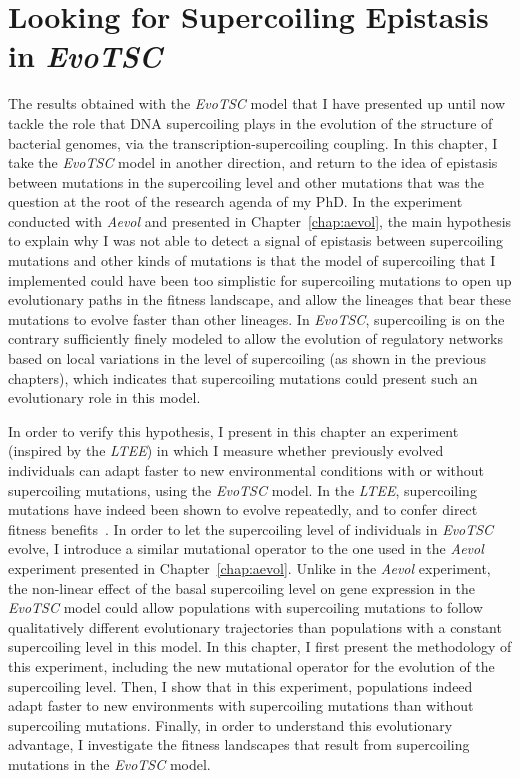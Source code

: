 \chapter{Looking for Supercoiling Epistasis in \emph{EvoTSC}}
\label{chap:epistasis}

The results obtained with the \emph{EvoTSC} model that I have presented up until now tackle the role that DNA supercoiling plays in the evolution of the structure of bacterial genomes, via the transcription-supercoiling coupling.
In this chapter, I take the \emph{EvoTSC} model in another direction, and return to the idea of epistasis between mutations in the supercoiling level and other mutations that was the question at the root of the research agenda of my PhD.
In the experiment conducted with \emph{Aevol} and presented in Chapter~\ref{chap:aevol}, the main hypothesis to explain why I was not able to detect a signal of epistasis between supercoiling mutations and other kinds of mutations is that the model of supercoiling that I implemented could have been too simplistic for supercoiling mutations to open up evolutionary paths in the fitness landscape, and allow the lineages that bear these mutations to evolve faster than other lineages.
In \emph{EvoTSC}, supercoiling is on the contrary sufficiently finely modeled to allow the evolution of regulatory networks based on local variations in the level of supercoiling (as shown in the previous chapters), which indicates that supercoiling mutations could present such an evolutionary role in this model.

In order to verify this hypothesis, I present in this chapter an experiment (inspired by the \emph{LTEE}) in which I measure whether previously evolved individuals can adapt faster to new environmental conditions with or without supercoiling mutations, using the \emph{EvoTSC} model.
In the \emph{LTEE}, supercoiling mutations have indeed been shown to evolve repeatedly, and to confer direct fitness benefits~\citep{crozat2005,crozat2010}.
In order to let the supercoiling level of individuals in \emph{EvoTSC} evolve, I introduce a similar mutational operator to the one used in the \emph{Aevol} experiment presented in Chapter~\ref{chap:aevol}.
Unlike in the \emph{Aevol} experiment, the non-linear effect of the basal supercoiling level on gene expression in the \emph{EvoTSC} model could allow populations with supercoiling mutations to follow qualitatively different evolutionary trajectories than populations with a constant supercoiling level in this model.
In this chapter, I first present the methodology of this experiment, including the new mutational operator for the evolution of the supercoiling level.
Then, I show that in this experiment, populations indeed adapt faster to new environments with supercoiling mutations than without supercoiling mutations.
Finally, in order to understand this evolutionary advantage, I investigate the fitness landscapes that result from supercoiling mutations in the \emph{EvoTSC} model.


